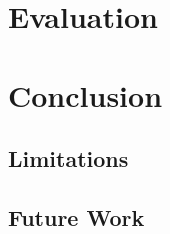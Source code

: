 \documentclass[sigconf]{acmart}
\begin{document}
\section{Evaluation}
\section{Conclusion}
\subsection{Limitations}
\subsection{Future Work}


%

\end{document}
